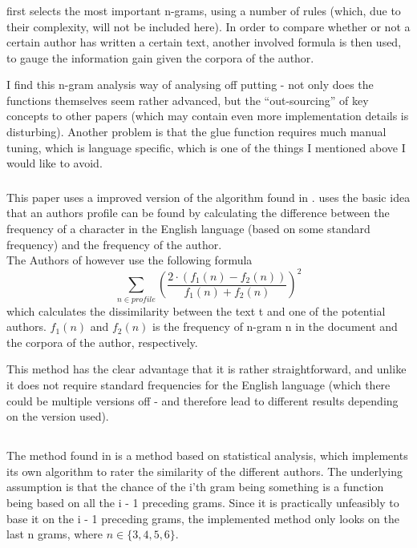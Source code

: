 \subsubsection{\cite{nr3}}
\cite{nr3} first selects the most important n-grams, using a number of rules (which, due to their complexity, will not be included here). In order to compare whether or not a certain author has written a certain text, another involved formula is then used, to gauge the information gain given the corpora of the author.

I find this n-gram analysis way of analysing off putting - not only does the functions themselves seem rather advanced, but the ``out-sourcing'' of key concepts to other papers (which may contain even more implementation details is disturbing). Another problem is that the glue function requires much manual tuning, which is language specific, which is one of the things I mentioned above I would like to avoid. 

\subsubsection{\cite{nr2}}
This paper uses a improved version of the algorithm found in \cite{Bennet}. \cite{Benet} uses the basic idea that an authors profile can be found by calculating the difference between the frequency of a character in the English language (based on some standard frequency) and the frequency of the author.\\

The Authors of \cite{nr2} however use the following formula
$$
\sum_{n \in profile}\left(\frac{2 \cdot (f_1(n) - f_2(n))}{f_1(n) + f_2(n)}\right)^2
$$
which calculates the dissimilarity between the text t and one of the potential authors. $f_1(n)$ and $f_2(n)$ is the frequency of n-gram n in the document and the corpora of the author, respectively. 

This method has the clear advantage that it is rather straightforward, and unlike \cite{Bennet} it does not require standard frequencies for the English language (which there could be multiple versions off - and therefore lead to different results depending on the version used).

\subsection{\cite{nr4}}
The method found in \cite{nr4} is a method based on statistical analysis, which implements its own algorithm to rater the similarity of the different authors. The underlying assumption is that the chance of the i'th gram being something is a function being based on all the i - 1 preceding grams. Since it is practically unfeasibly to base it on the i - 1 preceding grams, the implemented method only looks on the last n grams, where $n \in \{3,4,5,6 \}$. 

